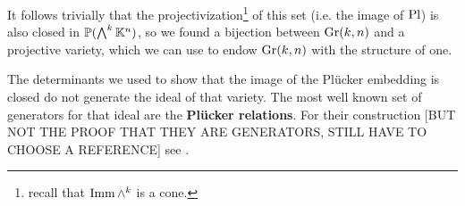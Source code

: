 \noindent
It follows trivially that the projectivization\footnote{recall that $\mathrm{Imm}\, \wedge^k$ is a cone.} of this set (i.e. the image of $\mathrm{Pl}$) is also closed in $\mathbb{P}(\bigwedge^k\mathbb{K}^n)$, so we found a bijection between $\mathrm{Gr}(k,n)$ and a projective variety, which we can use to endow $\mathrm{Gr}(k,n)$ with the structure of one.


\begin{remark}
The determinants we used to show that the image of the Pl\"ucker embedding is closed do not generate the ideal of that variety. The most well known set of generators for that ideal are the \textbf{Pl\"ucker relations}. For their construction [BUT NOT THE PROOF THAT THEY ARE GENERATORS, STILL HAVE TO CHOOSE A REFERENCE] see \cite{McKernan}.
\end{remark}










